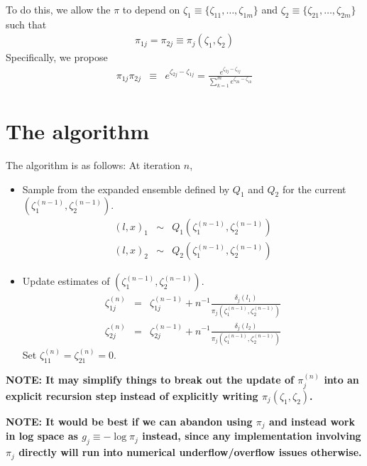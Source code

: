 \documentclass[aps,pre,twocolumn,nofootinbib,superscriptaddress,linenumbers,11point]{revtex4-1}
\begin{document}
To do this, we allow the $\pi$ to depend on $\zeta_1 \equiv \{\zeta_{11}, \ldots, \zeta_{1m}\}$ and $\zeta_2 \equiv \{\zeta_{21}, \ldots, \zeta_{2m}\}$ such that
\begin{eqnarray}
\pi_{1j} = \pi_{2j} \equiv \pi_j(\zeta_1, \zeta_2)
\end{eqnarray}
Specifically, we propose
\begin{eqnarray}
\pi_{1j} \pi_{2j} &\equiv& e^{\zeta_{2j} - \zeta_{1j}} = \frac{e^{\zeta_{2j} - \zeta_{1j}}}{\sum_{k=1}^m e^{\zeta_{2k} - \zeta_{1k}}}
\end{eqnarray}


\section*{The algorithm}
\label{section:the-algorithm}

The algorithm is as follows:
At iteration $n$,
\begin{itemize}
  \item Sample from the expanded ensemble defined by $Q_1$ and $Q_2$ for the current $(\zeta_1^{(n-1)}, \zeta_2^{(n-1)})$.
  \begin{eqnarray}
  (l, x)_1 &\sim& Q_1(\zeta_1^{(n-1)}, \zeta_2^{(n-1)}) \\
  (l, x)_2 &\sim& Q_2(\zeta_1^{(n-1)}, \zeta_2^{(n-1)})  
  \end{eqnarray}
  \item Update estimates of $(\zeta_1^{(n-1)}, \zeta_2^{(n-1)})$.
  \begin{eqnarray}
  \zeta_{1j}^{(n)} &=& \zeta_{1j}^{(n-1)} + n^{-1} \frac{\delta_j(l_1)}{\pi_j(\zeta_1^{(n-1)},\zeta_2^{(n-1)})} \\
  \zeta_{2j}^{(n)} &=& \zeta_{2j}^{(n-1)} + n^{-1} \frac{\delta_j(l_2)}{\pi_j(\zeta_1^{(n-1)},\zeta_2^{(n-1)})}
  \end{eqnarray}
  Set $\zeta_{11}^{(n)} = \zeta_{21}^{(n)} = 0$.
\end{itemize}

{\bf NOTE: It may simplify things to break out the update of $\pi_j^{(n)}$ into an explicit recursion step instead of explicitly writing $\pi_j(\zeta_1,\zeta_2)$.}

{\bf NOTE: It would be best if we can abandon using $\pi_j$ and instead work in log space as $g_j \equiv - \log \pi_j$ instead, since any implementation involving $\pi_j$ directly will run into numerical underflow/overflow issues otherwise.}
\end{document}
